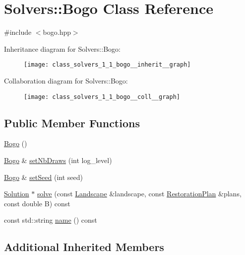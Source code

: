 \hypertarget{class_solvers_1_1_bogo}{}\section{Solvers\+:\+:Bogo Class Reference}
\label{class_solvers_1_1_bogo}


{\ttfamily \#include $<$bogo.\+hpp$>$}



Inheritance diagram for Solvers\+:\+:Bogo\+:\nopagebreak
\begin{figure}[H]
\begin{center}
\leavevmode
\texttt{[image: class\_solvers\_1\_1\_bogo\_\_inherit\_\_graph]}
\end{center}
\end{figure}


Collaboration diagram for Solvers\+:\+:Bogo\+:\nopagebreak
\begin{figure}[H]
\begin{center}
\leavevmode
\texttt{[image: class\_solvers\_1\_1\_bogo\_\_coll\_\_graph]}
\end{center}
\end{figure}
\subsection*{Public Member Functions}
\begin{DoxyCompactItemize}
\item 
\hyperlink{class_solvers_1_1_bogo_a2aa7f7e6b327254f789449a768dbf384}{Bogo} ()
\item 
\hyperlink{class_solvers_1_1_bogo}{Bogo} \& \hyperlink{class_solvers_1_1_bogo_a71508927ade20d8478509c1ec0ed7119}{set\+Nb\+Draws} (int log\+\_\+level)
\item 
\hyperlink{class_solvers_1_1_bogo}{Bogo} \& \hyperlink{class_solvers_1_1_bogo_ae47a955e952670eba66efad35c824023}{set\+Seed} (int seed)
\item 
\hyperlink{class_solution}{Solution} $\ast$ \hyperlink{class_solvers_1_1_bogo_a094c019a0efda929bd2369d2a47256f6}{solve} (const \hyperlink{class_landscape}{Landscape} \&landscape, const \hyperlink{class_restoration_plan}{Restoration\+Plan} \&plans, const double B) const
\item 
const std\+::string \hyperlink{class_solvers_1_1_bogo_a496539bab5a74757fe6d50e78e0a641f}{name} () const
\end{DoxyCompactItemize}
\subsection*{Additional Inherited Members}


